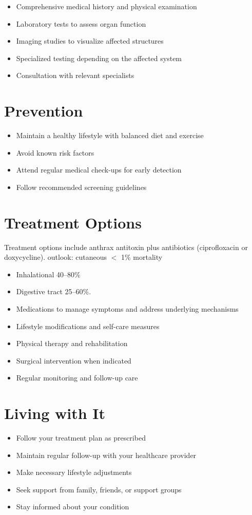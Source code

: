 \begin{itemize}[noitemsep]
  \item Comprehensive medical history and physical examination
  \item Laboratory tests to assess organ function
  \item Imaging studies to visualize affected structures
  \item Specialized testing depending on the affected system
  \item Consultation with relevant specialists
\end{itemize}
\section{Prevention}
\begin{itemize}[noitemsep]
  \item Maintain a healthy lifestyle with balanced diet and exercise
  \item Avoid known risk factors
  \item Attend regular medical check-ups for early detection
  \item Follow recommended screening guidelines
\end{itemize}
\section{Treatment Options}
Treatment options include anthrax antitoxin plus antibiotics (ciprofloxacin or doxycycline). outlook: cutaneous $<$ 1\% mortality

\begin{itemize}[noitemsep]
  \item Inhalational 40--80\%
  \item Digestive tract 25--60\%.
  \item Medications to manage symptoms and address underlying mechanisms
  \item Lifestyle modifications and self-care measures
  \item Physical therapy and rehabilitation
  \item Surgical intervention when indicated
  \item Regular monitoring and follow-up care
\end{itemize}
\section{Living with It}
\begin{itemize}[noitemsep]
  \item Follow your treatment plan as prescribed
  \item Maintain regular follow-up with your healthcare provider
  \item Make necessary lifestyle adjustments
  \item Seek support from family, friends, or support groups
  \item Stay informed about your condition
\end{itemize}
